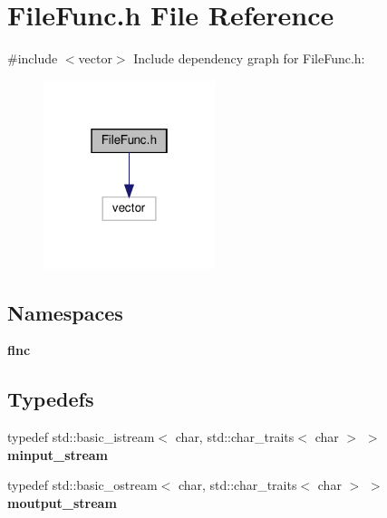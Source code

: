 \section{File\+Func.\+h File Reference}
\label{_file_func_8h}
{\ttfamily \#include $<$vector$>$}\newline
Include dependency graph for File\+Func.\+h\+:
\nopagebreak
\begin{figure}[H]
\begin{center}
\leavevmode
\includegraphics[width=142pt]{_file_func_8h__incl}
\end{center}
\end{figure}
\subsection*{Namespaces}
\begin{DoxyCompactItemize}
\item 
 \textbf{ flnc}
\end{DoxyCompactItemize}
\subsection*{Typedefs}
\begin{DoxyCompactItemize}
\item 
typedef std\+::basic\+\_\+istream$<$ char, std\+::char\+\_\+traits$<$ char $>$ $>$ \textbf{ minput\+\_\+stream}
\item 
typedef std\+::basic\+\_\+ostream$<$ char, std\+::char\+\_\+traits$<$ char $>$ $>$ \textbf{ moutput\+\_\+stream}
\end{DoxyCompactItemize}
